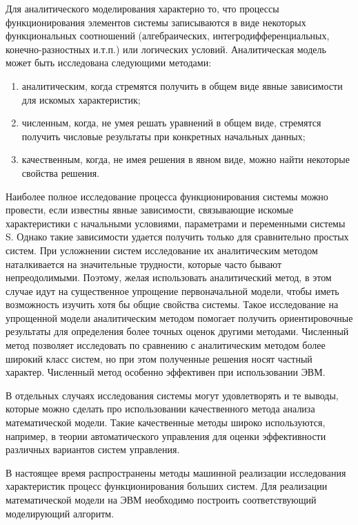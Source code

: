     Для аналитического моделирования характерно то, что процессы функционирования элементов системы записываются в виде некоторых функциональных соотношений (алгебраических, интегродифференциальных, конечно-разностных и.т.п.) или логических условий. Аналитическая модель может быть исследована следующими методами:
\begin{enumerate}
  \item аналитическим, когда стремятся получить в общем виде явные зависимости для искомых характеристик;
  \item численным, когда, не умея решать уравнений в общем виде, стремятся получить числовые результаты при конкретных начальных данных;
  \item качественным, когда, не имея решения в явном виде, можно найти некоторые свойства решения.
\end{enumerate}

    Наиболее полное исследование процесса функционирования системы можно провести, если известны явные зависимости, связывающие искомые характеристики с начальными условиями, параметрами и переменными системы S. Однако такие зависимости удается получить только для сравнительно простых систем. При усложнении систем исследование их аналитическим методом наталкивается на значительные трудности, которые часто бывают непреодолимыми. Поэтому, желая использовать аналитический метод, в этом случае идут на существенное упрощение первоначальной модели, чтобы иметь возможность изучить хотя бы общие свойства системы. Такое исследование на упрощенной модели аналитическим методом помогает получить ориентировочные результаты для определения более точных оценок другими методами. Численный метод позволяет исследовать по сравнению с аналитическим методом более широкий класс систем, но при этом полученные решения носят частный характер. Численный метод особенно эффективен при использовании ЭВМ.

    В отдельных случаях исследования системы могут удовлетворять и те выводы, которые можно сделать про использовании качественного метода анализа математической модели. Такие качественные методы широко используются, например, в теории автоматического управления для оценки эффективности различных вариантов систем управления.

    В настоящее время распространены методы машинной реализации исследования характеристик процесс функционирования больших систем. Для реализации математической модели на ЭВМ необходимо построить соответствующий моделирующий алгоритм.

